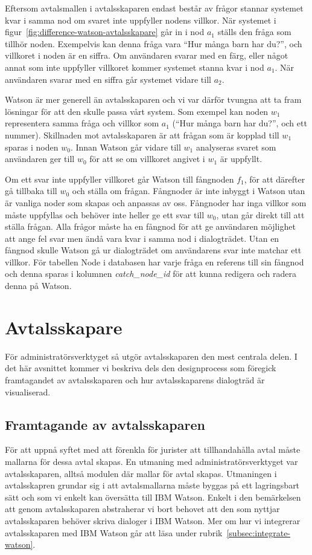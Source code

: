 \documentclass[a4paper,12pt]{article}
\begin{document}
Eftersom avtalsmallen i avtalsskaparen endast består av frågor stannar systemet kvar i samma nod om svaret inte uppfyller nodens villkor. När systemet i figur~\ref{fig:difference-watson-avtalsskapare} går in i nod $a_1$ ställs den fråga som tillhör noden. Exempelvis kan denna fråga vara ``Hur många barn har du?'', och villkoret i noden är en siffra. Om användaren svarar med en färg, eller något annat som inte uppfyller villkoret kommer systemet stanna kvar i nod $a_1$. När användaren svarar med en siffra går systemet vidare till $a_2$.

Watson är mer generell än avtalsskaparen och vi var därför tvungna att ta fram lösningar för att den skulle passa vårt system. Som exempel kan noden $w_1$ representera samma fråga och villkor som $a_1$ (``Hur många barn har du?'', och ett nummer). Skillnaden mot avtalsskaparen är att frågan som är kopplad till $w_1$ sparas i noden $w_0$. Innan Watson går vidare till $w_1$ analyseras svaret som användaren ger till $w_0$ för att se om villkoret angivet i $w_1$ är uppfyllt.



Om ett svar inte uppfyller villkoret går Watson till fångnoden $f_1$, för att därefter gå tillbaka till $w_0$ och ställa om frågan. Fångnoder är inte inbyggt i Watson utan är vanliga noder som skapas och anpassas av oss. Fångnoder har inga villkor som måste uppfyllas och behöver inte heller ge ett svar till $w_0$, utan går direkt till att ställa frågan. Alla frågor måste ha en fångnod för att ge användaren möjlighet att ange fel svar men ändå vara kvar i samma nod i dialogträdet. Utan en fångnod skulle Watson gå ur dialogträdet om användarens svar inte matchar ett villkor. För tabellen \mbox{Node} i databasen har varje fråga en referens till sin fångnod och denna sparas i kolumnen \mbox{\emph{catch\_node\_id}} för att kunna redigera och radera denna på Watson.

\FloatBarrier
\section{Avtalsskapare}
För administratörsverktyget så utgör avtalsskaparen den mest centrala delen. I det här avsnittet kommer vi beskriva dels den designprocess som föregick framtagandet av avtalsskaparen och hur avtalsskaparens dialogträd är visualiserad. 

\FloatBarrier
\subsection{Framtagande av avtalsskaparen} 
För att uppnå syftet med att förenkla för jurister att tillhandahålla avtal måste mallarna för dessa avtal skapas. En utmaning med administratörsverktyget var avtalsskaparen, alltså modulen där mallar för avtal skapas. Utmaningen i avtalsskapren grundar sig i att avtalsmallarna måste byggas på ett lagringsbart sätt och som vi enkelt kan översätta till IBM Watson. Enkelt i den bemärkelsen att genom avtalsskaparen abstraherar vi bort behovet att den som nyttjar avtalsskaparen behöver skriva dialoger i IBM Watson. Mer om hur vi integrerar avtalsskaparen med IBM Watson går att läsa under rubrik~\ref{subsec:integrate-watson}. 
\end{document}
